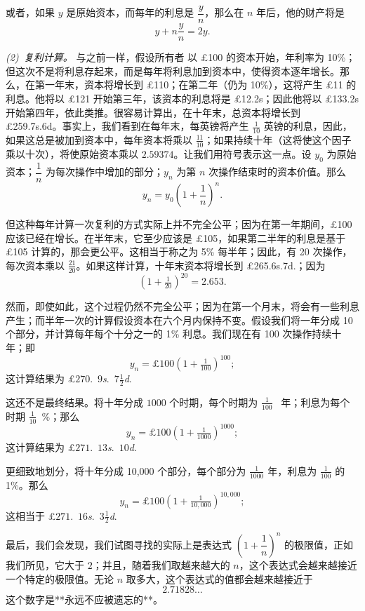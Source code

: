 \documentclass{ctexbook}
\newcommand{\Paragraph}[1]{\medskip\pagebreak[1]\par\textit{#1}}
\newcommand{\Pagelabel}[1]
  {\phantomsection\label{#1}}
\newcommand{\DPtypo}[2]{#2}%
\begin{document}
或者，如果 \( y \) 是原始资本，而每年的利息是 \( \dfrac{y}{n} \)，那么在 \( n \) 年后，他的财产将是
\[
y + n\dfrac{y}{n} = 2y.
\]

\Paragraph{{\upshape(2)}~复利计算。} 与之前一样，假设所有者
\Pagelabel{erratum0}%
以 £100 的资本开始，年利率为 10\%；但这次不是将利息存起来，而是每年将利息加到资本中，使得资本逐年增长。那么，在第一年末，资本将增长到 £110；在第二年（仍为 10\%），这将产生 £11 的利息。他将以 £121 开始第三年，该资本的利息将是 £12.2s；因此他将以 £133.2s 开始第四年，依此类推。很容易计算出，在十年末，总资本将增长到 £259.7s.6d。事实上，我们看到在每年末，每英镑将产生 \( \tfrac{1}{10} \) 英镑的利息，因此，如果这总是被加到资本中，每年资本将乘以 \( \tfrac{11}{10} \)；如果持续十年（这将使这个因子乘以十次），将使原始资本乘以 \( \DPtypo{2.59375}{2.59374} \)。让我们用符号表示这一点。设 \( y_0 \) 为原始资本；\( \dfrac{1}{n} \) 为每次操作中增加的部分；\( y_n \) 为第 \( n \) 次操作结束时的资本价值。那么
\[
y_n = y_0\left(1 + \frac{1}{n}\right)^n.
\]

但这种每年计算一次复利的方式实际上并不完全公平；因为在第一年期间，£100 应该已经在增长。在半年末，它至少应该是 £105，如果第二半年的利息是基于 £105 计算的，那会更公平。这相当于称之为 5\% 每半年；因此，有 20 次操作，每次资本乘以 \( \tfrac{21}{20} \)。如果这样计算，十年末资本将增长到
\DPtypo{£265.8s.}
       {£265.6s.7d.}；因为
\[
(1 + \tfrac{1}{20})^{20} = \DPtypo{2.654}{2.653}.
\]

然而，即使如此，这个过程仍然不完全公平；因为在第一个月末，将会有一些利息产生；而半年一次的计算假设资本在六个月内保持不变。假设我们将一年分成 10 个部分，并计算每年每个十分之一的 1\% 利息。我们现在有 100 次操作持续十年；即
\[
y_n = £100 \left( 1 + \tfrac{1}{100} \right)^{100};
\]
这计算结果为
\DPtypo{£$270$.~$8$\textit{s}.}
       {£$270$.~$9$\textit{s}.~$7\frac{1}{2}$\textit{d}.}

这还不是最终结果。将十年分成 $1000$ 个时期，每个时期为 $\frac{1}{100}$~ 年；利息为每个时期 $\frac{1}{10}$~\%；那么
\[
y_n = £100 \left( 1 + \tfrac{1}{1000} \right)^{1000};
\]
这计算结果为
\DPtypo{£$271$.~$14$\textit{s}.~$2\frac{1}{2}$\textit{d}.}
       {£$271$.~$13$\textit{s}.~$10$\textit{d}.}

更细致地划分，将十年分成 10,000 个部分，每个部分为 \( \frac{1}{1000} \) 年，利息为 \( \frac{1}{100} \) 的 1\%。那么
\[
y_n = £100 \left( 1 + \tfrac{1}{10,000} \right)^{10,000};
\]
这相当于
\DPtypo{£$271$.~$16$\textit{s}.~$4$\textit{d}.}
       {£$271$.~$16$\textit{s}.~$3\frac{1}{2}$\textit{d}.}

最后，我们会发现，我们试图寻找的实际上是表达式
$\left(1 + \dfrac{1}{n}\right)^n$ 的极限值，正如我们所见，它大于 $2$；并且，随着我们取越来越大的 $n$，这个表达式会越来越接近一个特定的极限值。无论 $n$ 取多大，这个表达式的值都会越来越接近于
\[
2.71828\ldots
\]
这个数字是**永远不应被遗忘的**。
\end{document}
